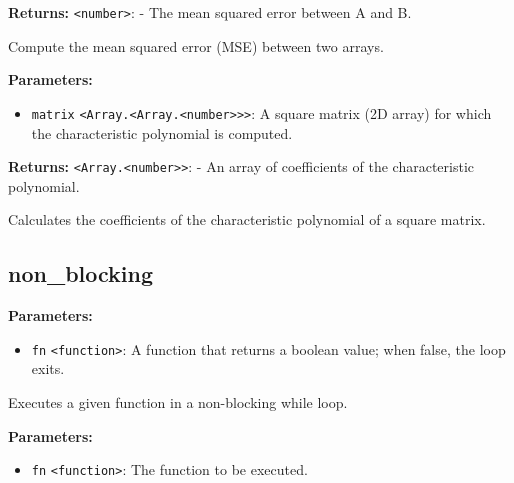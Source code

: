 \documentclass[12pt,a4paper]{article}
\begin{document}
\noindent \textbf{Returns:} \texttt{<number>}: - The mean squared error between A and B.

\noindent Compute the mean squared error (MSE) between two arrays.

\vspace{5mm}
\noindent {}


\noindent \textbf{Parameters:}
\begin{itemize}
  \item \texttt{matrix} \texttt{<Array.<Array.<number>>>}: A square matrix (2D array) for which the characteristic polynomial is computed.
\end{itemize}

\noindent \textbf{Returns:} \texttt{<Array.<number>>}: - An array of coefficients of the characteristic polynomial.

\noindent Calculates the coefficients of the characteristic polynomial of a square matrix.


\subsection{non\_blocking}
\vspace{5mm}
\noindent {}


\noindent \textbf{Parameters:}
\begin{itemize}
  \item \texttt{fn} \texttt{<function>}: A function that returns a boolean value; when false, the loop exits.
\end{itemize}

\noindent Executes a given function in a non-blocking while loop.

\vspace{5mm}
\noindent {}


\noindent \textbf{Parameters:}
\begin{itemize}
  \item \texttt{fn} \texttt{<function>}: The function to be executed.
\end{itemize}
\end{document}

